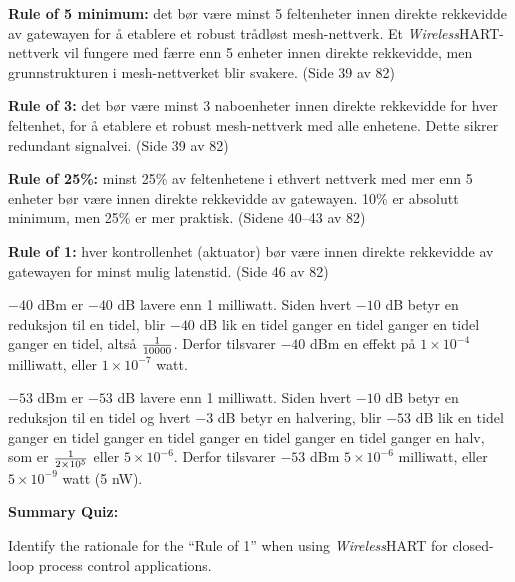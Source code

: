 
{\bf Rule of 5 minimum:} det bør være minst 5 feltenheter innen direkte rekkevidde av gatewayen for å etablere et robust trådløst mesh-nettverk. Et {\sl Wireless}HART-nettverk vil fungere med færre enn 5 enheter innen direkte rekkevidde, men grunnstrukturen i mesh-nettverket blir svakere. (Side 39 av 82)

\vskip 10pt

{\bf Rule of 3:} det bør være minst 3 naboenheter innen direkte rekkevidde for hver feltenhet, for å etablere et robust mesh-nettverk med alle enhetene. Dette sikrer redundant signalvei. (Side 39 av 82)

\vskip 10pt

{\bf Rule of 25\%:} minst 25\% av feltenhetene i ethvert nettverk med mer enn 5 enheter bør være innen direkte rekkevidde av gatewayen. 10\% er absolutt minimum, men 25\% er mer praktisk. (Sidene 40--43 av 82)

\vskip 10pt

{\bf Rule of 1:} hver kontrollenhet (aktuator) bør være innen direkte rekkevidde av gatewayen for minst mulig latenstid. (Side 46 av 82)


\vskip 30pt

\noindent
$-40$ dBm er $-40$ dB lavere enn 1 milliwatt. Siden hvert $-10$ dB betyr en reduksjon til en tidel, blir $-40$ dB lik en tidel ganger en tidel ganger en tidel ganger en tidel, altså $1 \over 10000$. Derfor tilsvarer $-40$ dBm en effekt på $1 \times 10^{-4}$ milliwatt, eller $1 \times 10^{-7}$ watt.

\vskip 10pt

\noindent
$-53$ dBm er $-53$ dB lavere enn 1 milliwatt. Siden hvert $-10$ dB betyr en reduksjon til en tidel og hvert $-3$ dB betyr en halvering, blir $-53$ dB lik en tidel ganger en tidel ganger en tidel ganger en tidel ganger en tidel ganger en halv, som er $1 \over {2 \times 10^5}$ eller $5 \times 10^{-6}$. Derfor tilsvarer $-53$ dBm $5 \times 10^{-6}$ milliwatt, eller $5 \times 10^{-9}$ watt (5 nW).










\vfil \eject

\noindent
{\bf Summary Quiz:}

Identify the rationale for the ``Rule of 1'' when using {\sl Wireless}HART for closed-loop process control applications.


